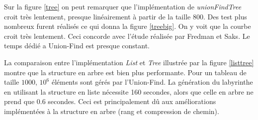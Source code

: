\documentclass[10pt]{article}
\begin{document}
Sur la figure \ref{tree} on peut remarquer que l'implémentation de \emph{unionFindTree} croit très lentement, presque linéairement à partir de la taille 800. Des test plus nombreux furent réalisés ce qui donna la figure \ref{treebig}. On y voit que la courbe croit très lentement. Ceci concorde avec l'étude réalisée par Fredman et Saks. Le temps dédié a Union-Find est presque constant.

La comparaison entre l'implémentation \emph{List} et \emph{Tree} illustrée par la figure \ref{listtree} montre que la structure en arbre est bien plus performante. Pour un tableau de taille $1000$, $10^{6}$ éléments sont gérés par l'Union-Find. La génération du labyrinthe en utilisant la structure en liste nécessite 160 secondes, alors que celle en arbre ne prend que 0.6 secondes. Ceci est principalement dû aux améliorations implémentées à la structure en arbre (rang et compression de chemin).
\end{document}
